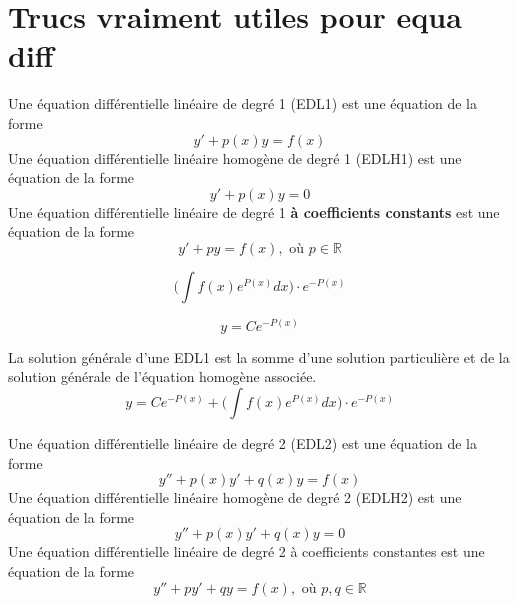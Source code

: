 \documentclass{report}
\begin{document}
\section{Trucs vraiment utiles pour equa diff}
\begin{defn}[EDL1]
Une équation différentielle linéaire de degré 1 (EDL1) est une équation de la forme
	\begin{equation*}
		y' + p(x)y = f(x)
	\end{equation*}
Une équation différentielle linéaire homogène de degré 1 (EDLH1) est une équation de la forme
	\begin{equation*}
		y' + p(x)y = 0
	\end{equation*}
Une équation différentielle linéaire de degré 1 \textbf{à coefficients constants} est une équation de la forme
	\begin{equation*}
		y' + py = f(x), \text{ où } p \in \mathbb R
	\end{equation*}
\end{defn}


\begin{thm}
	\begin{equation}
		\Biggl( \int f(x)e^{P(x)} dx \Biggr) \cdot e^{-P(x)}
	\end{equation}
\end{thm}

\begin{thm}
	\begin{equation}
		y = Ce^{-P(x)}
	\end{equation}
\end{thm}

\begin{thm}
La solution générale d'une EDL1 est la somme d'une solution particulière et de la solution générale de l'équation homogène associée.
	\begin{equation}
		y = Ce^{-P(x)} + \Biggl( \int f(x)e^{P(x)}dx \Biggr) \cdot e^{-P(x)}
	\end{equation}
\end{thm}

\begin{defn}[EDL2]
	Une équation différentielle linéaire de degré 2 (EDL2) est une équation de la forme
	\begin{equation*}
		y'' + p(x)y' + q(x)y = f(x)
	\end{equation*}
	Une équation différentielle linéaire homogène de degré 2 (EDLH2) est une équation de la forme
	\begin{equation*}
		y'' + p(x)y' + q(x)y = 0
	\end{equation*}
	Une équation différentielle linéaire de degré 2 à coefficients constantes est une équation de la forme
	\begin{equation*}
		y'' + py' + qy = f(x), \text{ où } p, q \in \mathbb R
	\end{equation*}
\end{defn}
\end{document}
